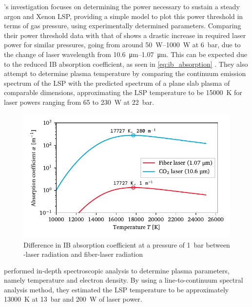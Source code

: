             \textcite{zimakovInteractionNearIRLaser2016}'s investigation focuses on determining the power necessary to sustain a steady argon and Xenon LSP, providing a simple model to plot this power threshold in terms of gas pressure, using experimentally determined parameters. Comparing their power threshold data with that of \textcite{moodyMaintenanceGasBreakdown1975} shows a drastic increase in required laser power for similar pressures, going from around \qtyrange{50}{1000}{W} at \qty{6}{bar}, due to the change of laser wavelength from \qtyrange{10.6}{1.07}{\um}. This can be expected due to the reduced IB absorption coefficient, as seen in \autoref{eq:ib_absorption} . They also attempt to determine plasma temperature by comparing the continuum emission spectrum of the LSP with the predicted spectrum of a plane slab plasma of comparable dimensions, approximating the LSP temperature to be \qty{15000}{K} for laser powers ranging from 65 to \qty{230}{W} at \qty{22}{bar}.

            \begin{figure}[h]
                \centering
                \includegraphics[]{assets/2 background/alphadiff}
                \caption[Difference in IB absorption coefficient between - and fiber-laser radiation]{Difference in IB absorption coefficient at a pressure of \qty{1}{bar} between -laser radiation and fiber-laser radiation}
                \label{fig:alphadiff}
            \end{figure}

            \textcite{luCharacteristicDiagnosticsLaserStabilized2022} performed in-depth spectroscopic analysis to determine plasma parameters, namely temperature and electron density. By using a line-to-continuum spectral analysis method, they estimated the LSP temperature to be approximately \qty{13000}{K} at \qty{13}{bar} and \qty{200}{W} of laser power.

